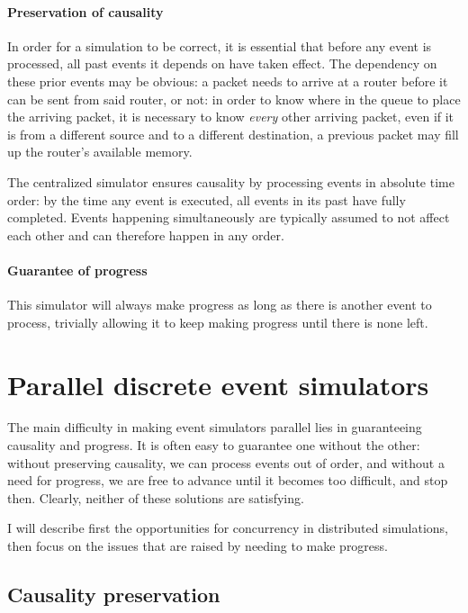 \paragraph{Preservation of causality}

In order for a simulation to be correct, it is essential that before any event is processed, all past events it depends on have taken effect.
The dependency on these prior events may be obvious: a packet needs to arrive at a router before it can be sent from said router, or not: in order to know where in the queue to place the arriving packet, it is necessary to know \emph{every} other arriving packet, even if it is from a different source and to a different destination, a previous packet may fill up the router's available memory.

The centralized simulator ensures causality by processing events in absolute time order: by the time any event is executed, all events in its past have fully completed.
Events happening simultaneously are typically assumed to not affect each other and can therefore happen in any order.

\paragraph{Guarantee of progress}
This simulator will always make progress as long as there is another event to process, trivially allowing it to keep making progress until there is none left.



\section{Parallel discrete event simulators} \label{pdes}

The main difficulty in making event simulators parallel lies in guaranteeing causality and progress.
It is often easy to guarantee one without the other: without preserving causality, we can process events out of order, and without a need for progress, we are free to advance until it becomes too difficult, and stop then.
Clearly, neither of these solutions are satisfying.

I will describe first the opportunities for concurrency in distributed simulations, then focus on the issues that are raised by needing to make progress.

\subsection{Causality preservation} \label{causality}

